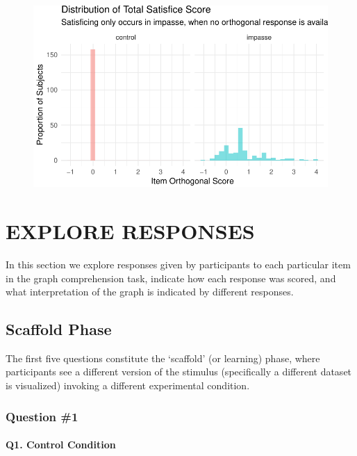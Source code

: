 \documentclass[
  letterpaper,
  DIV=11,
  numbers=noendperiod]{scrreprt}
\let\oldparagraph\paragraph
\renewcommand{\paragraph}[1]{\oldparagraph{#1}\mbox{}}
\begin{document}
\begin{figure}[H]

{\centering \includegraphics{analysis/SGC3A/2_sgc3A_scoring_files/figure-pdf/DIST-SUBSCORES-4.pdf}

}

\end{figure}

\hypertarget{explore-responses}{%
\section{EXPLORE RESPONSES}\label{explore-responses}}

In this section we explore responses given by participants to each
particular item in the graph comprehension task, indicate how each
response was scored, and what interpretation of the graph is indicated
by different responses.

\hypertarget{scaffold-phase}{%
\subsection{Scaffold Phase}\label{scaffold-phase}}

The first five questions constitute the `scaffold' (or learning) phase,
where participants see a different version of the stimulus (specifically
a different dataset is visualized) invoking a different experimental
condition.

\hypertarget{question-1}{%
\subsubsection{Question \#1}\label{question-1}}

\hypertarget{q1.-control-condition}{%
\paragraph{Q1. Control Condition}\label{q1.-control-condition}}
\end{document}
